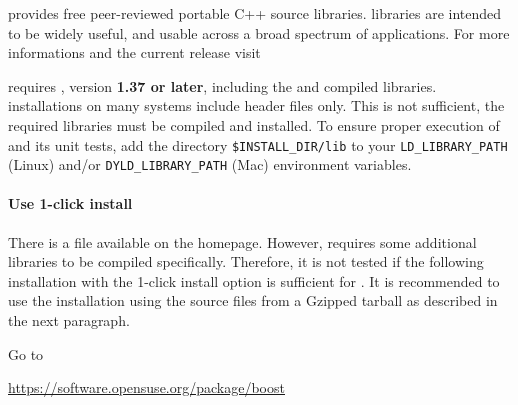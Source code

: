 % 
%               
%          
% 

\leveldown{\texorpdfstring{\protect\marktool{\boostname}}{\boostname{}}}

\marktool{\boostname} provides free peer-reviewed portable C++ source libraries. \marktool{\boostname} libraries are intended to be widely useful, and usable across a broad spectrum of applications. For more informations and the current release visit

\href{\boostaddress}{\boostaddress}

\marktool{\toolname} requires \marktool{\boostname}, version \textbf{1.37 or later}, including the  and  compiled libraries. \marktool{\boostname} installations on many systems include header files only.  This is not sufficient, the required libraries must be compiled and installed. To ensure proper execution of \marktool{\toolname} and its unit tests, add the \marktool{\boostname} directory \verb+$INSTALL_DIR/lib+ to your \verb+LD_LIBRARY_PATH+ (Linux) and/or \verb+DYLD_LIBRARY_PATH+ (Mac) environment variables.

\paragraph{Use 1-click install}

There is a  file available on the \marktool{\opensusename} homepage. However, \marktool{\boostname} requires some additional libraries to be compiled specifically. Therefore, it is not tested if the following installation with the 1-click install option is sufficient for \marktool{\toolname}. It is recommended to use the installation using the source files from a Gzipped tarball as described in the next paragraph.

Go to

\href{https://software.opensuse.org/package/boost}{https://software.opensuse.org/package/boost}

